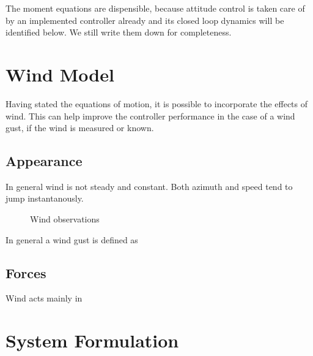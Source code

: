 The moment equations are dispensible, because attitude control is taken care of by an implemented controller already and its closed loop dynamics will be identified below. We still write them down for completeness.

\section{Wind Model}
Having stated the equations of motion, it is possible to incorporate the effects of wind. This can help improve the controller performance in the case of a wind gust, if the wind is measured or known. 

\subsection{Appearance}
In general wind is not steady and constant. Both azimuth and speed tend to jump instantanously.

\begin{figure}
\centering
{}
\caption{Wind observations}
\label{fig:wind_observations}
\end{figure}

\begin{figure}

\end{figure}

In general a wind gust is defined as 


\subsection{Forces}
Wind acts mainly in  

\section{System Formulation}

